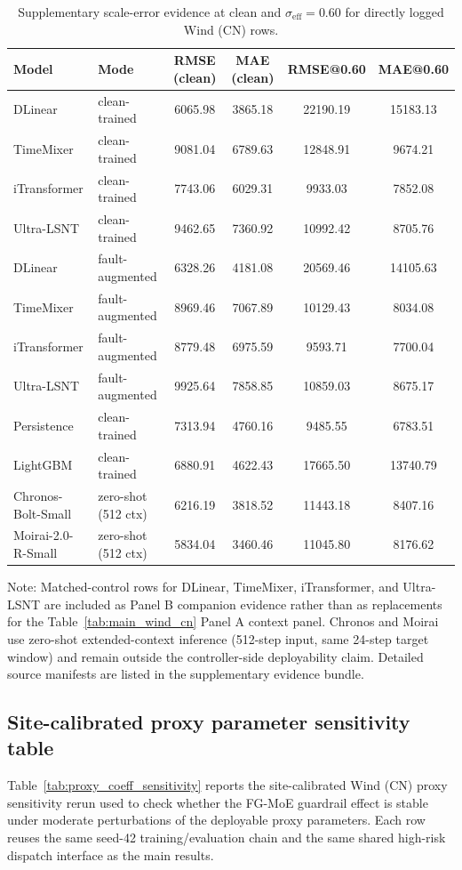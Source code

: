 \documentclass[review,1p,times]{elsarticle}
\newcommand{\aeTableNote}[1]{%
  \par\vspace{2pt}%
  \noindent\begin{minipage}{\linewidth}
    \raggedright\footnotesize
    Note: #1
  \end{minipage}%
  \par
}
\begin{document}
\begin{table}[t]
\centering
\caption{Supplementary scale-error evidence at clean and $\sigma_{\mathrm{eff}}=0.60$ for directly logged Wind (CN) rows.}
\label{tab:scale_error_audit}
\scriptsize
\setlength{\tabcolsep}{3.4pt}
\begin{tabular*}{\linewidth}{@{\extracolsep{\fill}}llcccc@{}}
\toprule
\textbf{Model} & \textbf{Mode} & \textbf{RMSE (clean)} & \textbf{MAE (clean)} & \textbf{RMSE@0.60} & \textbf{MAE@0.60} \\
\midrule
DLinear & clean-trained & 6065.98 & 3865.18 & 22190.19 & 15183.13 \\
TimeMixer & clean-trained & 9081.04 & 6789.63 & 12848.91 & 9674.21 \\
iTransformer & clean-trained & 7743.06 & 6029.31 & 9933.03 & 7852.08 \\
Ultra-LSNT & clean-trained & 9462.65 & 7360.92 & 10992.42 & 8705.76 \\
DLinear & fault-augmented & 6328.26 & 4181.08 & 20569.46 & 14105.63 \\
TimeMixer & fault-augmented & 8969.46 & 7067.89 & 10129.43 & 8034.08 \\
iTransformer & fault-augmented & 8779.48 & 6975.59 & 9593.71 & 7700.04 \\
Ultra-LSNT & fault-augmented & 9925.64 & 7858.85 & 10859.03 & 8675.17 \\
Persistence & clean-trained & 7313.94 & 4760.16 & 9485.55 & 6783.51 \\
LightGBM & clean-trained & 6880.91 & 4622.43 & 17665.50 & 13740.79 \\
Chronos-Bolt-Small & zero-shot (512 ctx) & 6216.19 & 3818.52 & 11443.18 & 8407.16 \\
Moirai-2.0-R-Small & zero-shot (512 ctx) & 5834.04 & 3460.46 & 11045.80 & 8176.62 \\
\bottomrule
\end{tabular*}
\aeTableNote{Matched-control rows for DLinear, TimeMixer, iTransformer, and Ultra-LSNT are included as Panel B companion evidence rather than as replacements for the Table~\ref{tab:main_wind_cn} Panel A context panel. Chronos and Moirai use zero-shot extended-context inference (512-step input, same 24-step target window) and remain outside the controller-side deployability claim. Detailed source manifests are listed in the supplementary evidence bundle.}
\end{table}

\subsection{Site-calibrated proxy parameter sensitivity table}
\label{subsec:proxy_coeff_sensitivity}
Table~\ref{tab:proxy_coeff_sensitivity} reports the site-calibrated Wind (CN) proxy sensitivity rerun used to check whether the FG-MoE guardrail effect is stable under moderate perturbations of the deployable proxy parameters. Each row reuses the same seed-42 training/evaluation chain and the same shared high-risk dispatch interface as the main results.
\end{document}
